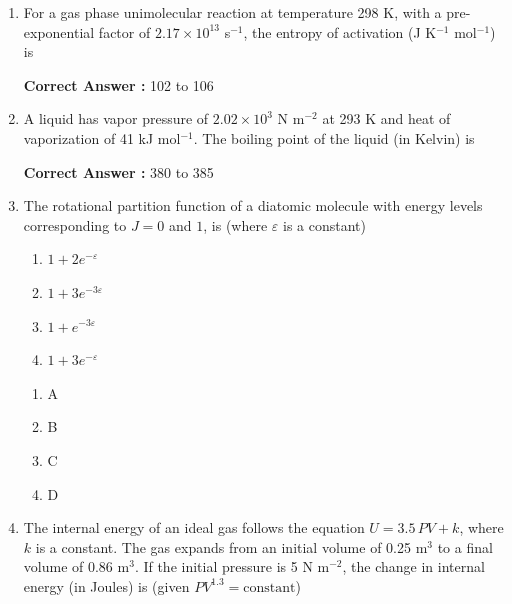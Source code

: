 \documentclass[journal,12pt,onecolumn]{exam}
\theoremstyle{remark}
\newcommand{\correct}{\textcolor{correctgreen}{\checkmark}}
\newcommand{\wrong}{\textcolor{wrongred}{\ding{55}}} %
\begin{document}
\begin{enumerate}
\item
For a gas phase unimolecular reaction at temperature 298 K, with a pre-exponential factor of $2.17 \times 10^{13}$ s$^{-1}$, the entropy of activation (J K$^{-1}$ mol$^{-1}$) is \underline{\hspace{3cm}}

\hfill{}


\textbf{Correct Answer :} \textcolor{green!60!black}{102 to 106}


\item
A liquid has vapor pressure of $2.02 \times 10^3$ N m$^{-2}$ at 293 K and heat of vaporization of 41 kJ mol$^{-1}$. The boiling point of the liquid (in Kelvin) is \underline{\hspace{3cm}}

\hfill{}


\textbf{Correct Answer :} \textcolor{green!60!black}{380 to 385}







\item
The rotational partition function of a diatomic molecule with energy levels corresponding to $J = 0$ and $1$, is (where $\varepsilon$ is a constant)

\begin{enumerate}
    \item $1 + 2e^{-\varepsilon}$
    \item $1 + 3e^{-3\varepsilon}$
    \item $1 + e^{-3\varepsilon}$
    \item $1 + 3e^{-\varepsilon}$
\end{enumerate}

\hfill{}

\begin{multicols}{2}
\begin{enumerate}
    \item \wrong A
    \item \wrong B
    \item \wrong C
    \item \correct D
\end{enumerate}
\end{multicols}


\item
The internal energy of an ideal gas follows the equation $U = 3.5 \, PV + k$, where $k$ is a constant. The gas expands from an initial volume of 0.25 m$^3$ to a final volume of 0.86 m$^3$. If the initial pressure is 5 N m$^{-2}$, the change in internal energy (in Joules) is (given $PV^{1.3} = \text{constant}$) \underline{\hspace{3cm}}


\end{enumerate}
\end{document}
